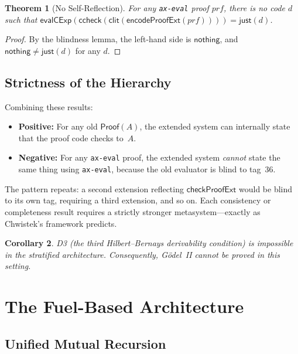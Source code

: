 \documentclass[11pt]{article}
\newtheorem{theorem}{Theorem}[section]
\newtheorem{corollary}[theorem]{Corollary}
\newcommand{\Proof}{\mathsf{Proof}}
\newcommand{\evalCExp}{\mathsf{evalCExp}}
\newcommand{\clit}{\mathsf{clit}}
\newcommand{\ccheck}{\mathsf{ccheck}}
\begin{document}
\begin{theorem}[No Self-Reflection]
  \label{thm:noselfref}
  For any \texttt{ax-eval} proof $\mathit{prf}$,
  there is no code $d$ such that
  $\evalCExp(\ccheck(\clit(\mathsf{encodeProofExt}(\mathit{prf})))) = \mathsf{just}(d)$.
\end{theorem}

\begin{proof}
  By the blindness lemma, the left-hand side is $\mathsf{nothing}$,
  and $\mathsf{nothing} \neq \mathsf{just}(d)$ for any $d$.
\end{proof}

\subsection{Strictness of the Hierarchy}

Combining these results:
\begin{itemize}[nosep]
  \item \textbf{Positive:} For any old $\Proof(A)$, the extended system
    can internally state that the proof code checks to~$A$.
  \item \textbf{Negative:} For any \texttt{ax-eval} proof, the extended
    system \emph{cannot} state the same thing using \texttt{ax-eval},
    because the old evaluator is blind to tag~36.
\end{itemize}

The pattern repeats: a second extension reflecting
$\mathsf{checkProofExt}$ would be blind to its own tag, requiring a
third extension, and so on. Each consistency or completeness result
requires a strictly stronger metasystem---exactly as Chwistek's
framework predicts.

\begin{corollary}
  D3 (the third Hilbert--Bernays derivability condition) is
  \emph{impossible} in the stratified architecture. Consequently,
  G\"odel~II cannot be proved in this setting.
\end{corollary}

\section{The Fuel-Based Architecture}
\label{sec:fuel}

\subsection{Unified Mutual Recursion}
\end{document}
